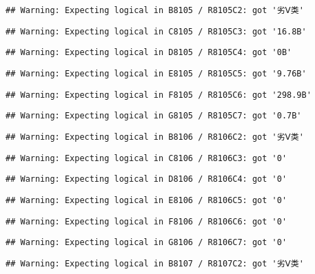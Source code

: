 \documentclass[
]{article}
\begin{document}
\begin{verbatim}
## Warning: Expecting logical in B8105 / R8105C2: got '劣Ⅴ类'
\end{verbatim}

\begin{verbatim}
## Warning: Expecting logical in C8105 / R8105C3: got '16.8B'
\end{verbatim}

\begin{verbatim}
## Warning: Expecting logical in D8105 / R8105C4: got '0B'
\end{verbatim}

\begin{verbatim}
## Warning: Expecting logical in E8105 / R8105C5: got '9.76B'
\end{verbatim}

\begin{verbatim}
## Warning: Expecting logical in F8105 / R8105C6: got '298.9B'
\end{verbatim}

\begin{verbatim}
## Warning: Expecting logical in G8105 / R8105C7: got '0.7B'
\end{verbatim}

\begin{verbatim}
## Warning: Expecting logical in B8106 / R8106C2: got '劣Ⅴ类'
\end{verbatim}

\begin{verbatim}
## Warning: Expecting logical in C8106 / R8106C3: got '0'
\end{verbatim}

\begin{verbatim}
## Warning: Expecting logical in D8106 / R8106C4: got '0'
\end{verbatim}

\begin{verbatim}
## Warning: Expecting logical in E8106 / R8106C5: got '0'
\end{verbatim}

\begin{verbatim}
## Warning: Expecting logical in F8106 / R8106C6: got '0'
\end{verbatim}

\begin{verbatim}
## Warning: Expecting logical in G8106 / R8106C7: got '0'
\end{verbatim}

\begin{verbatim}
## Warning: Expecting logical in B8107 / R8107C2: got '劣Ⅴ类'
\end{verbatim}
\end{document}
